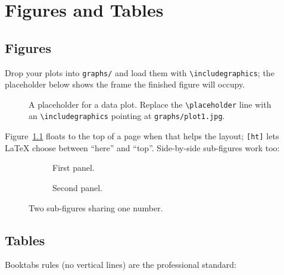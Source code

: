 %
\chapter{Figures and Tables}\label{ch:figures}

\section{Figures}
Drop your plots into \texttt{graphs/} and load them with
\texttt{\textbackslash includegraphics}; the placeholder below shows the frame the
finished figure will occupy.

\begin{figure}[ht]
  \centering
  \caption{A placeholder for a data plot. Replace the
    \texttt{\textbackslash placeholder} line with an
    \texttt{\textbackslash includegraphics} pointing at
    \texttt{graphs/plot1.jpg}.}
  \label{fig:plot1}
\end{figure}

Figure~\ref{fig:plot1} floats to the top of a page when that helps
the layout; \texttt{[ht]} lets LaTeX choose between ``here'' and
``top''. Side-by-side sub-figures work too:

\begin{figure}[ht]
  \centering
  \begin{subfigure}{0.48\linewidth}
    \centering
    \caption{First panel.}
  \end{subfigure}\hfill
  \begin{subfigure}{0.48\linewidth}
    \centering
    \caption{Second panel.}
  \end{subfigure}
  \caption{Two sub-figures sharing one number.}
  \label{fig:panels}
\end{figure}

\section{Tables}
Booktabs rules (no vertical lines) are the professional standard:

